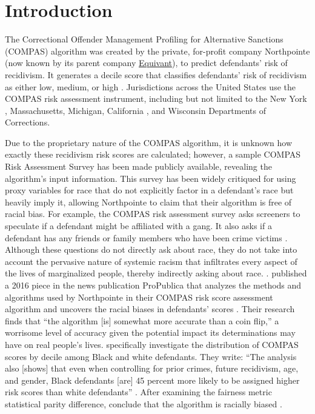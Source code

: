 \documentclass[water,article,submit,moreauthors,pdftex]{mdpi}
\begin{document}

\hypertarget{introduction}{%
\section{Introduction}\label{introduction}}

The Correctional Offender Management Profiling for Alternative Sanctions
(COMPAS) algorithm was created by the private, for-profit company
Northpointe (now known by its parent company
\href{https://www.equivant.com/faq/}{Equivant}), to predict defendants'
risk of recidivism. It generates a decile score that classifies
defendants' risk of recidivism as either low, medium, or high
\citep{angwin2016machine}. Jurisdictions across the United States use
the COMPAS risk assessment instrument, including but not limited to the
New York \citep{NYDOCCS2019}, Massachusetts, Michigan, California
\citep{Jackson2020Setting}, and Wisconsin \citep{WisconsinDOC}
Departments of Corrections.

Due to the proprietary nature of the COMPAS algorithm, it is unknown how
exactly these recidivism risk scores are calculated; however, a sample
COMPAS Risk Assessment Survey has been made publicly available,
revealing the algorithm's input information. This survey has been widely
critiqued for using proxy variables for race that do not explicitly
factor in a defendant's race but heavily imply it, allowing Northpointe
to claim that their algorithm is free of racial bias. For example, the
COMPAS risk assessment survey asks screeners to speculate if a defendant
might be affiliated with a gang. It also asks if a defendant has any
friends or family members who have been crime victims
\citep{Angwin2016Sample}. Although these questions do not directly ask
about race, they do not take into account the pervasive nature of
systemic racism that infiltrates every aspect of the lives of
marginalized people, thereby indirectly asking about race.
\citet{angwin2016machine}. published a 2016 piece in the news
publication ProPublica that analyzes the methods and algorithms used by
Northpointe in their COMPAS risk score assessment algorithm and uncovers
the racial biases in defendants' scores \citep{angwin2016machine}. Their
research finds that ``the algorithm {[}is{]} somewhat more accurate than
a coin flip,'' a worrisome level of accuracy given the potential impact
its determinations may have on real people's lives.
\citet{angwin2016machine} specifically investigate the distribution of
COMPAS scores by decile among Black and white defendants. They write:
``The analysis also {[}shows{]} that even when controlling for prior
crimes, future recidivism, age, and gender, Black defendants {[}are{]}
45 percent more likely to be assigned higher risk scores than white
defendants'' \citep{larson2016we}. After examining the fairness metric
statistical parity difference, \citet{angwin2016machine} conclude that
the algorithm is racially biased \citep{larson2016we}.
\end{document}
